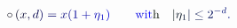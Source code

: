 \documentclass[12pt]{article}
\begin{document}
\makeatletter
\renewcommand*{\@textcolor}[3]{%
  \protect\leavevmode
  \begingroup
    \color#1{#2}#3%
  \endgroup
}
\makeatother
\begin{displaymath}
\mathcolor[RGB]{0,0,15}{\circ} \mathcolor[RGB]{0,0,30}{\left(} \mathcolor[RGB]{0,0,45}{x} \mathcolor[RGB]{0,0,60}{,} \mathcolor[RGB]{0,0,75}{d} \mathcolor[RGB]{0,0,90}{\right)} \mathcolor[RGB]{0,0,105}{=} \mathcolor[RGB]{0,0,120}{x} \mathcolor[RGB]{0,0,135}{(} \mathcolor[RGB]{0,0,150}{1} \mathcolor[RGB]{0,0,165}{+} \mathcolor[RGB]{0,0,180}{\eta} _ { \mathcolor[RGB]{0,0,195}{1} } \mathcolor[RGB]{0,0,210}{)} \qquad \mathrm { \mathcolor[RGB]{0,0,225}{w} \mathcolor[RGB]{0,0,240}{i} \mathcolor[RGB]{0,0,255}{t} \mathcolor[RGB]{0,15,0}{h} } \quad \mathcolor[RGB]{0,15,15}{|} \mathcolor[RGB]{0,15,30}{\eta} _ { \mathcolor[RGB]{0,15,45}{1} } \mathcolor[RGB]{0,15,60}{|} \mathcolor[RGB]{0,15,75}{\leq} \mathcolor[RGB]{0,15,90}{2} ^ { \mathcolor[RGB]{0,15,105}{-} \mathcolor[RGB]{0,15,120}{d} } \mathcolor[RGB]{0,15,135}{.}
\end{displaymath}
\end{document}
